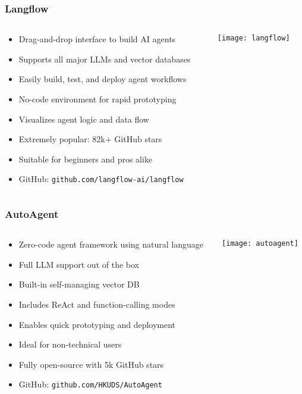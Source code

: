 \begin{frame}[fragile]\frametitle{Langflow}
\begin{columns}
    \begin{column}[T]{0.6\linewidth}
      \begin{itemize}
        \item Drag-and-drop interface to build AI agents
        \item Supports all major LLMs and vector databases
        \item Easily build, test, and deploy agent workflows
        \item No-code environment for rapid prototyping
        \item Visualizes agent logic and data flow
        \item Extremely popular: 82k+ GitHub stars
        \item Suitable for beginners and pros alike
        \item GitHub: \texttt{github.com/langflow-ai/langflow}
      \end{itemize}
    \end{column}
    \begin{column}[T]{0.4\linewidth}
        \begin{center}
        \texttt{[image: langflow]}
        \end{center}	
    \end{column}
\end{columns}
\end{frame}

\begin{frame}[fragile]\frametitle{AutoAgent}
\begin{columns}
    \begin{column}[T]{0.6\linewidth}
      \begin{itemize}
        \item Zero-code agent framework using natural language
        \item Full LLM support out of the box
        \item Built-in self-managing vector DB
        \item Includes ReAct and function-calling modes
        \item Enables quick prototyping and deployment
        \item Ideal for non-technical users
        \item Fully open-source with 5k GitHub stars
        \item GitHub: \texttt{github.com/HKUDS/AutoAgent}
      \end{itemize}
    \end{column}
    \begin{column}[T]{0.4\linewidth}
        \begin{center}
        \texttt{[image: autoagent]}
        \end{center}	
    \end{column}
\end{columns}
\end{frame}


